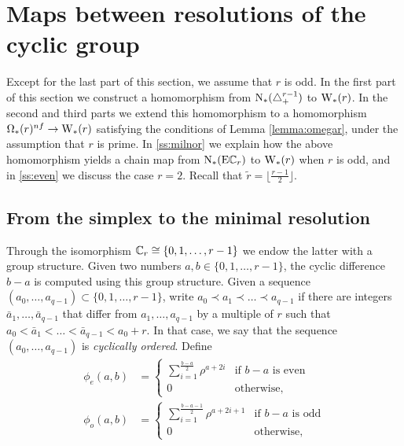 
\section{Maps between resolutions of the cyclic group}\label{s:resolutions}

Except for the last part of this section, we assume that $r$ is odd. In the first part of this section we construct a homomorphism from $\operatorname{N}_{*}(\triangle_{+}^{r-1})$ to $\operatorname{W}_{*}(r)$. In the second and third parts we extend this homomorphism to a homomorphism $\Omega_*(r)^{nf}\to \operatorname{W}_{*}(r)$ satisfying the conditions of Lemma \ref{lemma:omegar}, under the assumption that $r$ is prime. In \cref{ss:milnor} we explain how the above homomorphism yields a chain map from $\operatorname{N}_{*}(\mathrm{E}\mathbb{C}_r)$ to $\operatorname{W}_{*}(r)$ when $r$ is odd, and in \cref{ss:even} we discuss the case $r=2$. Recall that $\tilde{r} = \lfloor \frac{r-1}{2}\rfloor$.

\subsection{From the simplex to the minimal resolution}

Through the isomorphism $\mathbb{C}_r \cong \{0,1,\ldots,r-1\}$ we endow the latter with a group structure. Given two numbers $a,b\in \{0,1,\ldots,r-1\}$, the cyclic difference $b-a$ is computed using this group structure. Given a sequence $(a_0,\ldots,a_{q-1})\subset \{0,1,\ldots,r-1\}$, write $a_0\prec a_1\prec \ldots\prec a_{q-1}$ if there are integers $\bar{a}_1,\ldots,\bar{a}_{q-1}$ that differ from $a_1,\ldots,a_{q-1}$ by a multiple of $r$ such that $a_0<\bar{a}_1<\ldots<\bar{a}_{q-1}<a_0+r$. In that case, we say that the sequence $(a_0,\ldots,a_{q-1})$ is \emph{cyclically ordered}. Define
\begin{align*}
	\phi_{e}(a,b) &= \begin{cases}
		\displaystyle \sum_{i=1}^{\frac{b-a}{2}} \rho^{a+2i} & \text{if $b-a$ is even} \\
		0 & \text{otherwise,}
	\end{cases}
	\\
	\phi_{o}(a,b) &= \begin{cases}
		\displaystyle \sum_{i=1}^{\frac{b-a-1}{2}} \rho^{a+2i+1} & \text{if $b-a$ is odd} \\
		0 & \text{otherwise,}
	\end{cases}
\end{align*}

